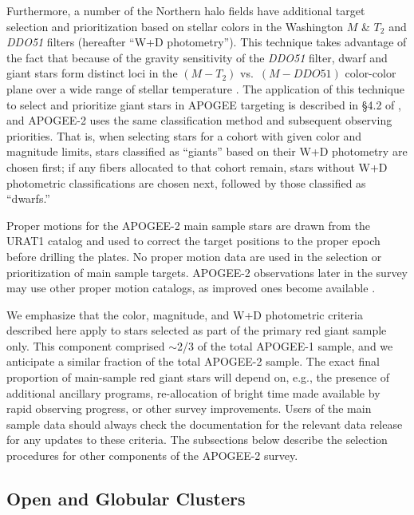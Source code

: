 \documentclass[12pt,twocolumn]{emulateapj}
\begin{document}
Furthermore, a number of the Northern halo fields have additional target
selection and prioritization based on stellar colors in the 
Washington $M$ \& $T_2$ and {\it DDO51} filters (hereafter ``W+D photometry'').
This technique takes advantage of the fact that 
because of the gravity sensitivity of the {\it DDO51} filter,
dwarf and giant stars form distinct loci in the $(M-T_2)$ vs.\ $(M-DDO51)$
color-color plane over a wide range of stellar temperature \citep[e.g.,][]{Majewski_00_W+Dtech}.
The application of this technique to select and prioritize giant stars 
in APOGEE targeting is described in \S4.2 of \citet{Zasowski_2013_apogeetargeting},
and APOGEE-2 uses the same classification method and subsequent observing priorities.  
That is, when selecting stars for a cohort with given color and magnitude limits,
stars classified as ``giants'' based on their W+D photometry are chosen first;
if any fibers allocated to that cohort remain, stars without W+D photometric classifications
are chosen next, followed by those classified as ``dwarfs.''

Proper motions for the APOGEE-2 main sample stars are drawn from the URAT1 catalog \citep{Zacharias_2015_urat1} and used to correct the target positions to the proper epoch before drilling the plates.  No proper motion data are used in the selection or prioritization of main sample targets.  APOGEE-2 observations later in the survey may use other proper motion catalogs, as improved ones become available \citep[e.g.,  {\it Gaia} and UCAC5;][]{GaiaCollab_2016_gaiaDR1,Zacharias_2017_ucac5}.

We emphasize that the color, magnitude, and W+D photometric criteria described here apply to stars 
selected as part of the primary red giant sample only.
This component comprised $\sim$2/3 of the total APOGEE-1 sample, and
we anticipate a similar fraction of the total APOGEE-2 sample.
The exact final proportion of main-sample red giant stars will depend on, e.g., the presence of additional ancillary programs, re-allocation of bright time made available by rapid observing progress, or other survey improvements.
Users of the main sample data should always check the documentation for the relevant data release for any updates to these criteria.
The subsections below describe the selection procedures for other
components of the APOGEE-2 survey.

\subsection{Open and Globular Clusters}
\label{sec:clusters}
\end{document}
